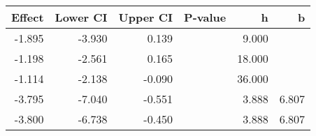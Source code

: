 \begin{table}[ht]
\centering
\begin{tabular}{rrrrrr}
  \hline
Effect & Lower CI & Upper CI & P-value & h & b \\ 
  \hline
-1.895 & -3.930 & 0.139 &  & 9.000 &  \\ 
  -1.198 & -2.561 & 0.165 &  & 18.000 &  \\ 
  -1.114 & -2.138 & -0.090 &  & 36.000 &  \\ 
  -3.795 & -7.040 & -0.551 &  & 3.888 & 6.807 \\ 
  -3.800 & -6.738 & -0.450 &  & 3.888 & 6.807 \\ 
   \hline
\end{tabular}
\end{table}
